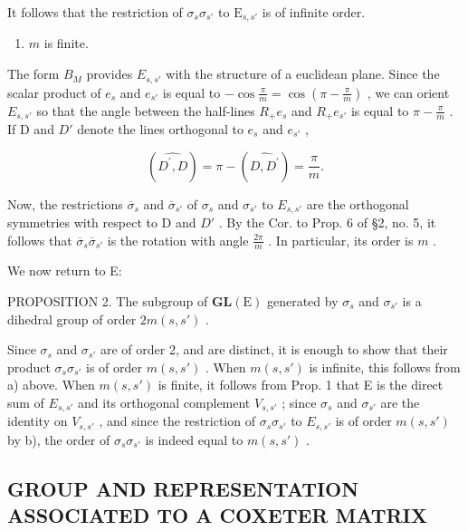 It follows that the restriction of \(\sigma_s\sigma_{s'}\) to \(\mathrm{E}_{s,s'}\) is of infinite order.

\begin{enumerate}
\def\labelenumi{\alph{enumi})}
\setcounter{enumi}{1}
\tightlist
\item
  \(m\) is finite.
\end{enumerate}

The form \(B_{M}\) provides \(E_{s,s'}\) with the structure of a euclidean plane. Since the scalar product of \(e_{s}\) and \(e_{s'}\) is equal to \(-\cos\frac{\pi}{m}=\cos\left(\pi-\frac{\pi}{m}\right)\) , we can orient \(E_{s,s'}\) so that the angle between the half-lines \(R_{+}e_{s}\) and \(R_{+}e_{s'}\) is equal to \(\pi-\frac{\pi}{m}\) . If D and \(D'\) denote the lines orthogonal to \(e_{s}\) and \(e_{s'}\) ,

\[
(\widehat {D ^ {\prime} , D}) = \pi - (\widehat {D , D ^ {\prime}}) = \frac {\pi}{m}.
\]

Now, the restrictions \(\overline{\sigma}_s\) and \(\overline{\sigma}_{s'}\) of \(\sigma_s\) and \(\sigma_{s'}\) to \(E_{s,s'}\) are the orthogonal symmetries with respect to D and \(D'\) . By the Cor. to Prop. 6 of §2, no. 5, it follows that \(\overline{\sigma}_s\overline{\sigma}_{s'}\) is the rotation with angle \(\frac{2\pi}{m}\) . In particular, its order is \(m\) .

We now return to E:

PROPOSITION 2. The subgroup of \(\mathbf{GL}(\mathrm{E})\) generated by \(\sigma_s\) and \(\sigma_{s'}\) is a dihedral group of order \(2m(s,s')\) .

Since \(\sigma_s\) and \(\sigma_{s'}\) are of order 2, and are distinct, it is enough to show that their product \(\sigma_s\sigma_{s'}\) is of order \(m(s,s')\) . When \(m(s,s')\) is infinite, this follows from a) above. When \(m(s, s')\) is finite, it follows from Prop. 1 that E is the direct sum of \(E_{s,s'}\) and its orthogonal complement \(V_{s,s'}\) ; since \(\sigma_s\) and \(\sigma_{s'}\) are the identity on \(V_{s,s'}\) , and since the restriction of \(\sigma_s\sigma_{s'}\) to \(E_{s,s'}\) is of order \(m(s, s')\) by b), the order of \(\sigma_s\sigma_{s'}\) is indeed equal to \(m(s, s')\) .

\subsection{GROUP AND REPRESENTATION ASSOCIATED TO A COXETER MATRIX}


